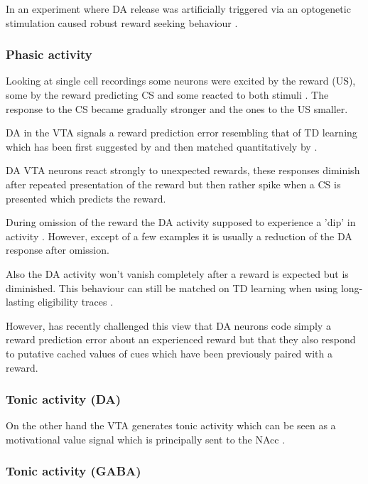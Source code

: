 \documentclass[12pt,a4paper]{article}
\begin{document}
In an experiment where DA release was artificially triggered via an optogenetic stimulation caused robust reward seeking behaviour \citep{Steinberg2013}.

\subsubsection{Phasic activity}

Looking at single cell recordings some neurons were excited by the reward (US), some by the reward predicting CS and some reacted to both stimuli \citep{Cohen2012}. The response to the CS became gradually stronger and the ones to the US smaller.

DA in the VTA signals a reward prediction error resembling that of TD learning which has been first suggested by \citep{Schultz1997} and then matched quantitatively by \citep{Bayer2005}.

DA VTA neurons react strongly to unexpected rewards, these responses diminish after repeated presentation of the reward but then rather spike when a CS is presented which predicts the reward. 

During omission of the reward the DA activity supposed to experience a 'dip' in activity \citep{Takahashi2017}. However, except of a few examples it is usually a reduction of the DA response after omission. 

Also the DA activity won't vanish completely after a reward is expected but is diminished. This behaviour can still be matched on TD learning when using long-lasting eligibility traces \citep{Pan2005}.

However, \citep{Sadacca2016} has recently challenged this view that DA neurons code simply a reward prediction error about an experienced reward but that they also respond to putative cached values of cues which have been previously paired with a reward.

\subsubsection{Tonic activity (DA)}

On the other hand the VTA generates tonic activity which can be seen as a motivational value signal which is principally sent to the NAcc \citep{Sesack2010}\citep{Bromberg-Martin2010} .

\subsubsection{Tonic activity (GABA)}
\end{document}
